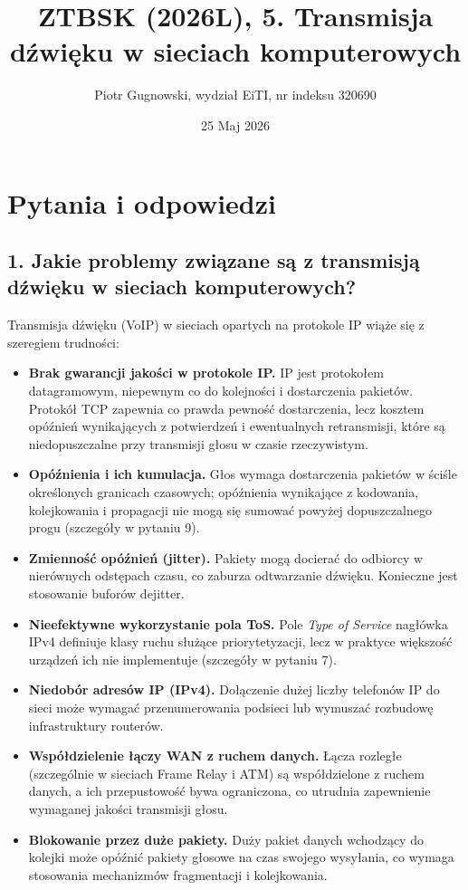 \documentclass[12pt,a4paper]{article}
\title{ZTBSK (2026L), 5. Transmisja dźwięku w sieciach komputerowych}
\author{Piotr Gugnowski, wydział EiTI, nr indeksu 320690}
\date{25 Maj 2026}
\begin{document}
\maketitle

\section*{Pytania i odpowiedzi}

\subsection*{1. Jakie problemy związane są z transmisją dźwięku w sieciach
komputerowych?}

Transmisja dźwięku (VoIP) w sieciach opartych na protokole IP wiąże się
z szeregiem trudności:

\begin{itemize}
  \item \textbf{Brak gwarancji jakości w protokole IP.}
        IP jest protokołem datagramowym, niepewnym co do kolejności i dostarczenia
        pakietów. Protokół TCP zapewnia co prawda pewność dostarczenia, lecz
        kosztem opóźnień wynikających z potwierdzeń i ewentualnych retransmisji,
        które są niedopuszczalne przy transmisji głosu w czasie rzeczywistym.
  \item \textbf{Opóźnienia i ich kumulacja.}
        Głos wymaga dostarczenia pakietów w ściśle określonych granicach
        czasowych; opóźnienia wynikające z kodowania, kolejkowania i propagacji
        nie mogą się sumować powyżej dopuszczalnego progu (szczegóły w pytaniu 9).
  \item \textbf{Zmienność opóźnień (jitter).}
        Pakiety mogą docierać do odbiorcy w nierównych odstępach czasu, co
        zaburza odtwarzanie dźwięku. Konieczne jest stosowanie buforów dejitter.
  \item \textbf{Nieefektywne wykorzystanie pola ToS.}
        Pole \emph{Type of Service} nagłówka IPv4 definiuje klasy ruchu służące
        priorytetyzacji, lecz w praktyce większość urządzeń ich nie implementuje
        (szczegóły w pytaniu 7).
  \item \textbf{Niedobór adresów IP (IPv4).}
        Dołączenie dużej liczby telefonów IP do sieci może wymagać przenumerowania
        podsieci lub wymuszać rozbudowę infrastruktury routerów.
  \item \textbf{Współdzielenie łączy WAN z ruchem danych.}
        Łącza rozległe (szczególnie w sieciach Frame Relay i ATM) są
        współdzielone z ruchem danych, a ich przepustowość bywa ograniczona,
        co utrudnia zapewnienie wymaganej jakości transmisji głosu.
  \item \textbf{Blokowanie przez duże pakiety.}
        Duży pakiet danych wchodzący do kolejki może opóźnić pakiety głosowe
        na czas swojego wysyłania, co wymaga stosowania mechanizmów fragmentacji
        i kolejkowania.
\end{itemize}
\end{document}
